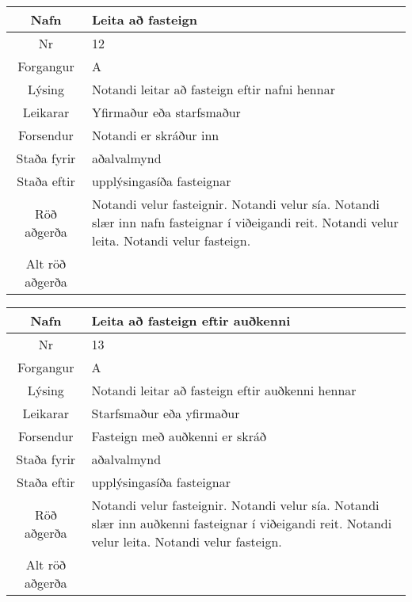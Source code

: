 \caption{Use case 11}\label{tab:use_case_11}
\begin{table}[h!]\centering
\begin{tabular}{|c|p{10cm}|}
\hline
Nafn&Leita að fasteign \\
\hline
Nr&12\\
\hline
Forgangur&A\\
\hline
Lýsing&Notandi leitar að fasteign eftir nafni hennar\\
\hline
Leikarar&Yfirmaður eða starfsmaður\\
\hline
Forsendur&Notandi er skráður inn\\
\hline
Staða fyrir&aðalvalmynd\\
\hline
Staða eftir&upplýsingasíða fasteignar\\
\hline
Röð aðgerða&Notandi velur fasteignir. Notandi velur sía. Notandi slær inn nafn fasteignar í viðeigandi reit. Notandi velur leita. Notandi velur fasteign.\\
\hline
Alt röð aðgerða&\\
\hline
\end{tabular}
\end{table}
\caption{Use case 12}\label{tab:use_case_12}
\begin{table}[h!]\centering
\begin{tabular}{|c|p{10cm}|}
\hline
Nafn&Leita að fasteign eftir auðkenni\\
\hline
Nr&13\\
\hline
Forgangur&A\\
\hline
Lýsing&Notandi leitar að fasteign eftir auðkenni hennar\\
\hline
Leikarar&Starfsmaður eða yfirmaður\\
\hline
Forsendur&Fasteign með auðkenni er skráð\\
\hline
Staða fyrir&aðalvalmynd\\
\hline
Staða eftir&upplýsingasíða fasteignar\\
\hline
Röð aðgerða&Notandi velur fasteignir. Notandi velur sía. Notandi slær inn auðkenni fasteignar í viðeigandi reit. Notandi velur leita. Notandi velur fasteign.\\
\hline
Alt röð aðgerða&\\
\hline
\end{tabular}
\end{table}
\caption{Use case 13}\label{tab:use_case_13}
